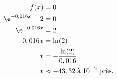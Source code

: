 \begin{align*}
f(x) &= 0 \\
\e^{-0,016x} - 2 &= 0 \\
\e^{-0,016x} &= 2 \\
-0,016x &= \ln(2) \\
x &= -\dfrac{\ln(2)}{0,016} \\
x &\approx -43,32 \; \text{à} \; 10^{-2} \; \text{près.}
\end{align*}

\bigskip
